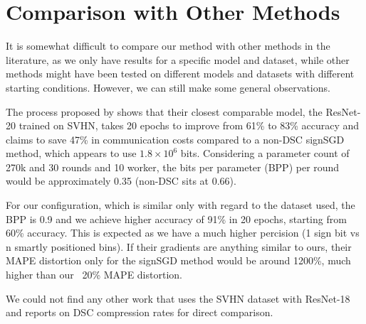 
\section{Comparison with Other Methods}
It is somewhat difficult to compare our method with other methods in the literature, as we only have results for a specific model and dataset, while other methods might have been tested on different models and datasets with different starting conditions. However, we can still make some general observations.

The process proposed by \cite{ZhangTao2022} shows that their closest comparable model, the ResNet-20 trained on SVHN, takes 20 epochs to improve from 61\% to 83\% accuracy and claims to save 47\% in communication costs compared to a non-DSC signSGD method, which appears to use $1.8 \times 10^6$ bits. Considering a parameter count of 270k and 30 rounds and 10 worker, the bits per parameter (BPP) per round would be approximately 0.35 (non-DSC sits at 0.66).

For our configuration, which is similar only with regard to the dataset used, the BPP is 0.9 and we achieve higher accuracy of 91\% in 20 epochs, starting from 60\% accuracy. This is expected as we have a much higher percision (1 sign bit vs n smartly positioned bins).
If their gradients are anything similar to ours, their MAPE distortion only for the signSGD method would be around 1200\%, much higher than our ~20\% MAPE distortion.

We could not find any other work that uses the SVHN dataset with ResNet-18 and reports on DSC compression rates for direct comparison.
